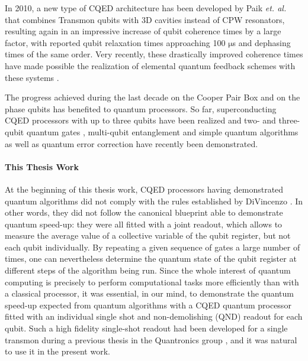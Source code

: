 In 2010, a new type of CQED architecture has been
developed by Paik {\it et. al.} \citep{paik_observation_2011} that combines Transmon
qubits with 3D cavities instead of CPW resonators, resulting again
in an impressive increase of qubit coherence times by a large factor, with reported qubit relaxation times approaching 100 $\mathrm{\mu}$s and dephasing times of the same order.
Very recently, these drastically improved coherence times have made
possible the realization of elemental quantum feedback schemes with these systems \citep{vijay_quantum_2012}.

\smallskip

The progress achieved during the last decade on the
Cooper Pair Box and on the phase qubits has benefited to quantum processors.
So far, superconducting CQED processors with up to three qubits have
been realized and two- and three-qubit quantum gates \citep{fedorov_implementation_2011},
multi-qubit entanglement \citep{dicarlo_preparation_2010,ansmann_violation_2009} and simple
quantum algorithms \citep{dicarlo_demonstration_2009,mariantoni_implementing_2011} as well as
quantum error correction  \citep{reed_realization_2011} have recently
been demonstrated.

\smallskip

\paragraph{This Thesis Work}

At the beginning of this thesis work, CQED processors
having demonstrated quantum algorithms did not comply with the rules
established by DiVincenzo \citep{divincenzo_physical_2000}. In other words, they
did not follow the canonical blueprint able to demonstrate quantum
speed-up: they were all fitted with a joint readout, which allows
to measure the average value of a collective variable of the qubit
register, but not each qubit individually. By repeating a given sequence
of gates a large number of times, one can nevertheless determine the
quantum state of the qubit register at different steps of the algorithm
being run. Since the whole interest of quantum computing is precisely
to perform computational tasks more efficiently than with a classical
processor, it was essential, in our mind, to demonstrate the quantum
speed-up expected from quantum algorithms with a CQED quantum processor
fitted with an individual single shot and non-demolishing (QND) readout
for each qubit. Such a high fidelity single-shot readout had been
developed for a single transmon during a previous thesis in the Quantronics
group \citep{mallet_single-shot_2009,palacios-laloy_superconducting_2010}, and it was natural to use it in the present work.

